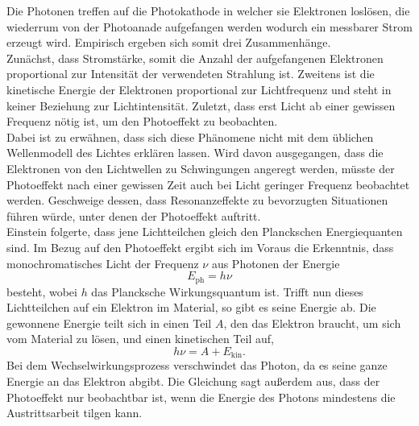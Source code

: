 Die Photonen treffen auf die Photokathode in welcher sie Elektronen loslösen, die wiederrum von der Photoanade aufgefangen werden wodurch ein messbarer Strom erzeugt wird.
Empirisch ergeben sich somit drei Zusammenhänge.\\
Zunächst, dass Stromstärke, somit die Anzahl der aufgefangenen Elektronen proportional zur Intensität der verwendeten Strahlung ist.
Zweitens ist die kinetische Energie der Elektronen proportional zur Lichtfrequenz und steht in keiner Beziehung zur Lichtintensität.
Zuletzt, dass erst Licht ab einer gewissen Frequenz nötig ist, um den Photoeffekt zu beobachten.\\
Dabei ist zu erwähnen, dass sich diese Phänomene nicht mit dem üblichen Wellenmodell des Lichtes erklären lassen.
Wird davon ausgegangen, dass die Elektronen von den Lichtwellen zu Schwingungen angeregt werden, müsste der Photoeffekt nach einer gewissen Zeit auch bei Licht geringer Frequenz beobachtet werden.
Geschweige dessen, dass Resonanzeffekte zu bevorzugten Situationen führen würde, unter denen der Photoeffekt auftritt.\\
Einstein folgerte, dass jene Lichtteilchen gleich den Planckschen Energiequanten sind.
Im Bezug auf den Photoeffekt ergibt sich im Voraus die Erkenntnis, dass monochromatisches Licht der Frequenz $\nu$ aus Photonen der Energie
\begin{equation}
  E_{\text{ph}} = h \nu
\end{equation}
besteht, wobei $h$ das Plancksche Wirkungsquantum ist.
Trifft nun dieses Lichtteilchen auf ein Elektron im Material, so gibt es seine Energie ab.
Die gewonnene Energie teilt sich in einen Teil $A$, den das Elektron braucht, um sich vom Material zu lösen, und einen kinetischen Teil auf,
\begin{equation}
  \label{eqn:bla}
  h \nu = A + E_{\text{kin}}.
\end{equation}
Bei dem Wechselwirkungsprozess verschwindet das Photon, da es seine ganze Energie an das Elektron abgibt.
Die Gleichung sagt außerdem aus, dass der Photoeffekt nur beobachtbar ist, wenn die Energie des Photons mindestens die Austrittsarbeit tilgen kann.

